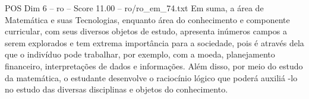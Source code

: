 \begin{textsample}{POS Dim 6 – ro – Score 11.00 – ro/ro\_em\_74.txt}
Em suma, a área de Matemática e suas Tecnologias, enquanto área do conhecimento e componente curricular, com seus diversos objetos de estudo, apresenta inúmeros campos a serem explorados e tem extrema importância para a sociedade, pois é através dela que o indivíduo pode trabalhar, por exemplo, com a moeda, planejamento financeiro, interpretações de dados e informações.
Além disso, por meio do estudo da matemática, o estudante desenvolve o raciocínio lógico que poderá auxiliá -lo no estudo das diversas disciplinas e objetos do conhecimento.

\end{textsample}
